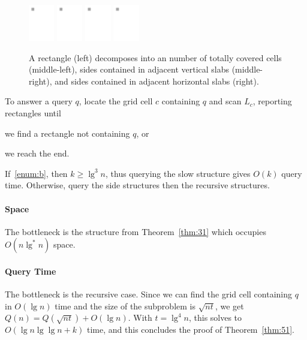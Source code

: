 \documentclass[letterpaper,12pt,twocolumn]{article}
\newcommand{\BigOh}[1]{O\!\left(#1\right)}
\theoremstyle{plain}
\begin{document}
\begin{figure}[t!]
  \centering
    \includegraphics[width=0.10\textwidth,page=1]{figures/grid-decomposition}
    \includegraphics[width=0.10\textwidth,page=2]{figures/grid-decomposition}
    \includegraphics[width=0.10\textwidth,page=4]{figures/grid-decomposition}
    \includegraphics[width=0.10\textwidth,page=3]{figures/grid-decomposition}
  \caption[Grid decomposition]{A rectangle (left) decomposes into an
    number of totally covered cells (middle-left), sides contained in
    adjacent vertical slabs (middle-right), and sides contained in
    adjacent horizontal slabs (right).}\label{fig:grid:decomposition}
\end{figure}

To answer a query $q$, locate the grid cell $c$ containing $q$ and
scan $L_c$, reporting rectangles until
%
\begin{enumerate*}[label=(\alph*)] %
\item\label{enum:a} we find a rectangle not containing $q$, or
\item\label{enum:b} we reach the end.
\end{enumerate*}

If~\ref{enum:b}, then $k \ge \lg^3 n$, thus querying the slow
structure gives $\BigOh{k}$ query time.  Otherwise, query the side
structures then the recursive structures.

\paragraph{Space}
The bottleneck is the structure from Theorem~\ref{thm:31} which
occupies $\BigOh{n\lg^* n}$ space.

\paragraph{Query Time}
The bottleneck is the recursive case.  Since we can find the grid cell
containing $q$ in $\BigOh{\lg n}$ time and the size of the subproblem
is $\sqrt{nt}$, we get $Q(n) = Q(\sqrt{nt}) + \BigOh{\lg n}$.  With
$t = \lg^4n$, this solves to $\BigOh{\lg n\lg\lg n + k}$ time, and
this concludes the proof of Theorem~\ref{thm:51}.



\end{document}
